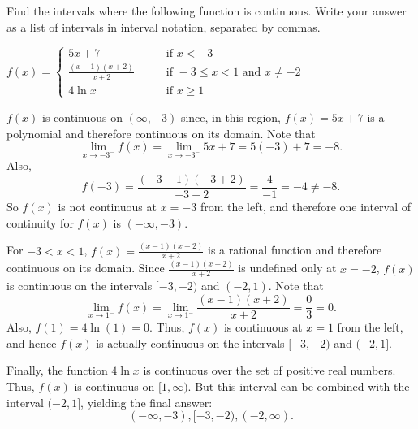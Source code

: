 \documentclass[handout,nooutcomes]{ximera}
\begin{document}
\begin{problem}
Find the intervals where the following function is continuous.  Write your answer as a list of intervals in interval notation, separated by commas.
	
	$f(x) =   \left\{ \begin{array}{cl}
	5x + 7		 	&	\qquad \text{if } x < -3					\\
	\frac{(x-1)(x+2)}{x+2}	&	\qquad \text{if } -3 \leq x < 1 \text{ and } x \neq -2	\\
	4 \ln x				&	\qquad \text{if } x \geq 1					\end{array} \right.  $
	
	\begin{freeResponse}
	
	$f(x)$ is continuous on $(\infty, -3)$ since, in this region, $f(x)=5x+7$ is a polynomial and therefore continuous on its domain.  Note that 
	$$\lim_{x \to -3^-} f(x) = \lim_{x \to -3^-} 5x+7 = 5(-3) + 7 = -8.$$
	  Also, 
	  $$f(-3) = \frac{(-3-1)(-3+2)}{-3+2} = \frac{4}{-1} = -4 \neq -8.$$
	   So $f(x)$ is not continuous at $x=-3$ from the left, and therefore one interval of continuity for $f(x)$ is $(-\infty, -3)$.  
	
	For $-3 < x < 1$, $f(x) = \frac{(x-1)(x+2)}{x+2}$ is a rational function and therefore continuous on its domain.  Since $\frac{(x-1)(x+2)}{x+2}$ is undefined only at $x=-2$, $f(x)$ is continuous on the intervals $[-3,-2)$ and $(-2, 1)$.  Note that 
	$$\lim_{x \to 1^-} f(x) = \lim_{x \to 1^-} \frac{(x-1)(x+2)}{x+2} = \frac{0}{3} = 0.$$
	Also, $f(1) = 4 \ln (1) = 0$.  Thus, $f(x)$ is continuous at $x=1$ from the left, and hence $f(x)$ is actually continuous on the intervals $[-3,-2)$ and $(-2, 1]$.
	
	Finally, the function $4 \ln x$ is continuous over the set of positive real numbers.  Thus, $f(x)$ is continuous on $[1, \infty)$.  But this interval can be combined with the interval $(-2, 1]$, yielding the final answer:
	$$(-\infty, -3), [-3, -2), (-2, \infty).$$
	
	\end{freeResponse}
	
	
			
	
\end{problem}
	
	
	
	
			
			
\end{document}
